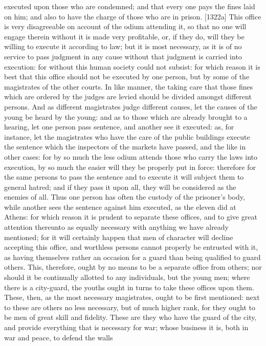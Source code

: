 executed upon those who are condemned; and that every one pays the fines
laid on him; and also to have the charge of those who are in prison.
[1322a] This office is very disagreeable on account of the odium attending
it, so that no one will engage therein without it is made very profitable,
or, if they do, will they be willing to execute it according to law; but
it is most necessary, as it is of no service to pass judgment in any cause
without that judgment is carried into execution: for without this human
society could not subsist: for which reason it is best that this office
should not be executed by one person, but by some of the magistrates of
the other courts. In like manner, the taking care that those fines which
are ordered by the judges are levied should be divided amongst different
persons. And as different magistrates judge different causes, let the
causes of the young be heard by the young: and as to those which are
already brought to a hearing, let one person pass sentence, and another
see it executed: as, for instance, let the magistrates who have the care
of the public buildings execute the sentence which the inspectors of the
markets have passed, and the like in other cases: for by so much the less
odium attends those who carry the laws into execution, by so much the
easier will they be properly put in force: therefore for the same persons
to pass the sentence and to execute it will subject them to general
hatred; and if they pass it upon all, they will be considered as the
enemies of all. Thus one person has often the custody of the prisoner's
body, while another sees the sentence against him executed, as the eleven
did at Athens: for which reason it is prudent to separate these offices,
and to give great attention thereunto as equally necessary with anything
we have already mentioned; for it will certainly happen that men of
character will decline accepting this office, and worthless persons cannot
properly be entrusted with it, as having themselves rather an occasion for
a guard than being qualified to guard others. This, therefore, ought by no
means to be a separate office from others; nor should it be continually
allotted to any individuals, but the young men; where there is a
city-guard, the youths ought in turns to take these offices upon them.
These, then, as the most necessary magistrates, ought to be first
mentioned: next to these are others no less necessary, but of much higher
rank, for they ought to be men of great skill and fidelity. These are they
who have the guard of the city, and provide everything that is necessary
for war; whose business it is, both in war and peace, to defend the walls
